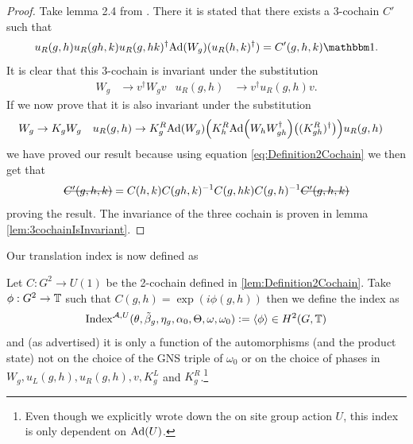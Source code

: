 \documentclass[12pt,a4paper,twoside]{article}
\numberwithin{equation}{section}
\begin{document}
\begin{proof}
	Take lemma 2.4 from \cite{ogata2021h3gmathbb}. There it is stated that there exists a 3-cochain $C'$ such that
	\begin{equation}\label{eq:defintion3CochainProof2Cochain}
		u_R(g,h)u_R(gh,k)u_R(g,hk)^\dagger\Ad{W_g}(u_R(h,k)^\dagger)=C'(g,h,k)\id.
	\end{equation}
	It is clear that this 3-cochain is invariant under the substitution
	\begin{align}
		W_g&\rightarrow v^\dagger W_g v&u_R(g,h)&\rightarrow v^\dagger u_R(g,h)v.
	\end{align}
	If we now prove that it is also invariant under the substitution
	\begin{align}\label{eq:SubstitutionForProofCochain}
		W_g&\rightarrow K_g W_g&u_R(g,h)&\rightarrow K_g^R\Ad{W_g}\left(K_h^R\Ad{W_hW_{gh}^\dagger}\left((K_{gh}^R)^\dagger\right)\right)u_
		R(g,h)
	\end{align}
	we have proved our result because using equation \eqref{eq:Definition2Cochain} we then get that
	\begin{equation}
		\stkout{C'(g,h,k)}=C(h,k)C(gh,k)^{-1}C(g,hk)C(g,h)^{-1}\stkout{C'(g,h,k)}
	\end{equation}
	proving the result. The invariance of the three cochain is proven in lemma \ref{lem:3cochainIsInvariant}.
\end{proof}
Our translation index is now defined as
\begin{definition}
	Let $C:G^2\rightarrow U(1)$ be the 2-cochain defined in \ref{lem:Definition2Cochain}. Take $\phi:G^2\rightarrow\mathbb T$ such that $C(g,h)=\exp(i\phi(g,h))$ then we define the index as
	\begin{equation}
	\textrm{Index}^{\mathcal A,U}(\theta,\tilde{\beta}_g,\eta_g,\alpha_0,\Theta,\omega,\omega_0)\vcentcolon=\expval{\phi}\in H^2(G,\mathbb T)
	\end{equation}
	and (as advertised) it is only a function of the automorphisms (and the product state) not on the choice of the GNS triple of $\omega_0$ or on the choice of phases in $W_g,u_L(g,h),u_R(g,h),v,K_g^L$ and $K_g^R$.\footnote{Even though we explicitly wrote down the on site group action $U$, this index is only dependent on $\Ad{U}$.}
\end{definition}
\end{document}
